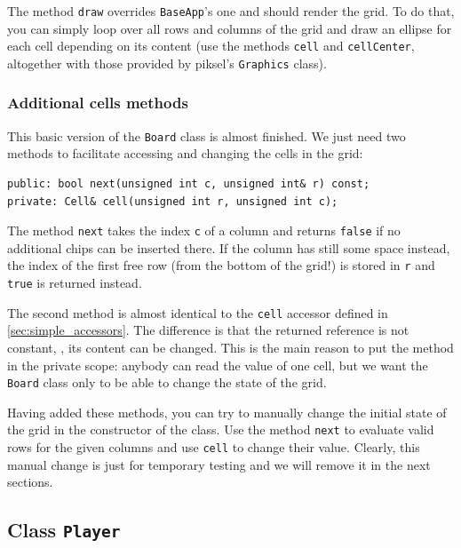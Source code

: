 \documentclass{article}
\begin{document}
The method \texttt{draw} overrides \texttt{BaseApp}'s one and should render the grid. To do that, you can simply loop over all rows and columns of the grid and draw an ellipse for each cell depending on its content (use the methods \texttt{cell} and \texttt{cellCenter}, altogether with those provided by piksel's \texttt{Graphics} class).


\subsubsection{Additional cells methods}

This basic version of the \texttt{Board} class is almost finished. We just need two methods to facilitate accessing and changing the cells in the grid:
\begin{center}
\begin{minipage}{.9\textwidth}
\begin{lstlisting}[style=mycpp,numbers=none]
public: bool next(unsigned int c, unsigned int& r) const;
private: Cell& cell(unsigned int r, unsigned int c);
\end{lstlisting}
\end{minipage}
\end{center}
The method \texttt{next} takes the index \texttt{c} of a column and returns \texttt{false} if no additional chips can be inserted there. If the column has still some space instead, the index of the first free row (from the bottom of the grid!) is stored in \texttt{r} and \texttt{true} is returned instead.

The second method is almost identical to the \texttt{cell} accessor defined in \cref{sec:simple_accessors}. The difference is that the returned reference is not constant, \ie, its content can be changed. This is the main reason to put the method in the private scope: anybody can read the value of one cell, but we want the \texttt{Board} class only to be able to change the state of the grid.

Having added these methods, you can try to manually change the initial state of the grid in the constructor of the class. Use the method \texttt{next} to evaluate valid rows for the given columns and use \texttt{cell} to change their value. Clearly, this manual change is just for temporary testing and we will remove it in the next sections.




\subsection{Class \texttt{Player}}
\end{document}
